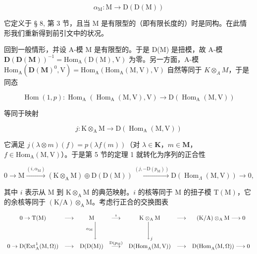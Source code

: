 \[
\alpha_ {\mathrm{M}}: \mathrm{M} \longrightarrow \mathrm{D} (\mathrm{D(M)})
\]

它定义于 § 8, 第 3 节，且当 M 是有限型的（即有限长度的）时是同构。在此情形我们重新得到前引文中的状况。

回到一般情形，并设 A-模 M 是有限型的。于是 D(M) 是扭模，故 A-模 \(\mathbf{D}(\mathbf{D}(\mathbf{M}))^{-1} = \mathrm{Hom}_{\mathrm{A}}(\mathrm{D}(\mathrm{M}), \mathrm{V})\) 为零。另一方面，A-模 \(\mathrm{Hom}_{\mathrm{A}}(\mathbf{D}(\mathbf{M})^{0}, \mathrm{V}) = \mathrm{Hom}_{\mathrm{A}}(\mathrm{Hom}_{\mathrm{A}}(\mathrm{M}, \mathrm{V}), \mathrm{V})\) 自然等同于 \(K \otimes_{A} M\)，于是同态

\[
\operatorname{Hom} (1, p): \operatorname{Hom} _ {\mathrm{A}} (\operatorname{Hom} _ {\mathrm{A}} (\mathrm{M}, \mathrm{V}), \mathrm{V}) \longrightarrow \mathrm{D} (\operatorname{Hom} _ {\mathrm{A}} (\mathrm{M}, \mathrm{V}))
\]

等同于映射

\[
j: \mathrm{K} \otimes_ {\mathrm{A}} \mathrm{M} \longrightarrow \mathrm{D} (\operatorname{Hom} _ {\mathrm{A}} (\mathrm{M}, \mathrm{V}))
\]

它满足 \(j(\lambda \otimes m)(f) = p(\lambda f(m))\)（对 \(\lambda \in \mathbf{K}\)，\(m \in \mathbf{M}\)，\(f \in \mathrm{Hom}_{\mathrm{A}}(\mathrm{M},\mathrm{V})\)）。于是第 5 节的定理 1 就转化为序列的正合性

\[
0 \longrightarrow \mathrm{M} \xrightarrow {(i , \alpha_ {\mathrm{M}})} (\mathrm{K} \otimes_ {\mathrm{A}} \mathrm{M}) \oplus \mathrm{D} (\mathrm{D} (\mathrm{M})) \xrightarrow {(j , - \mathrm{D} (p _ {\mathrm{M}}))} \mathrm{D} (\operatorname{Hom} _ {\Lambda} (\mathrm{M}, \mathrm{V})) \longrightarrow 0,
\]

其中 \(i\) 表示从 M 到 \(\mathrm{K} \otimes_{\mathrm{A}} \mathrm{M}\) 的典范映射。\(i\) 的核等同于 M 的扭子模 \(\mathrm{T(M)}\)，它的余核等同于 \((\mathrm{K/A}) \otimes_{\mathrm{A}} \mathrm{M}\)。考虑行正合的交换图表

\[
\begin{array}{c c c c c c c} 0 \to \mathrm{T(M)} & \longrightarrow & \mathrm{M} & \stackrel {{\imath}} {{\longrightarrow}} & \mathrm {K\otimes_ {A} M} & \longrightarrow & (\mathrm{K/A}) \otimes_ {\mathrm{A}} \mathrm{M} \longrightarrow 0 \\ & & ^ {\alpha_ {\mathrm{M}}} \Bigg \downarrow & & \Bigg \downarrow_ {j} \\ 0 \to \mathrm{D(Ext} _ {\mathrm{A}} ^ {1} (\mathrm{M}, \Omega)) & \longrightarrow & \mathrm{D(D(M))} & \stackrel {{\mathrm{D} (p _ {\mathrm{M}})}} {{\longrightarrow}} & \mathrm{D(Hom} _ {\mathrm{A}} (\mathrm{M}, \mathrm{V})) & \longrightarrow & \mathrm{D(Hom} _ {\mathrm{A}} (\mathrm{M}, \Omega)) \longrightarrow 0 \end{array}
\]

